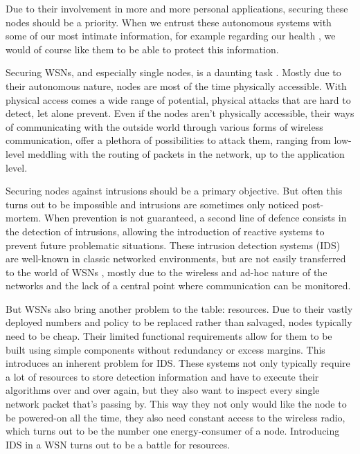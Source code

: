 \documentclass[conference]{IEEEtran}
\begin{document}
Due to their involvement in more and more personal applications, securing these
nodes should be a priority. When we entrust these autonomous systems with some
of our most intimate information, for example regarding our health
\cite{stankovic2005wireless}, we would of course like them to be able to
protect this information.

Securing WSNs, and especially single nodes, is a daunting task
\cite{perrig2004security}. Mostly due to their autonomous nature, nodes are
most of the time physically accessible. With physical access comes a wide range
of potential, physical attacks \cite{becher2006tampering} that are hard to
detect, let alone prevent. Even if the nodes aren't physically accessible,
their ways of communicating with the outside world through various forms of
wireless communication, offer a plethora of possibilities
\cite{padmavathi2009survey} to attack them, ranging from low-level meddling
with the routing of packets in the network, up to the application level.

Securing nodes against intrusions should be a primary objective. But often this
turns out to be impossible and intrusions are sometimes only noticed
post-mortem. When prevention is not guaranteed, a second line of defence
consists in the detection of intrusions, allowing the introduction of reactive
systems to prevent future problematic situations. These intrusion detection
systems (IDS) are well-known in classic networked environments, but are not
easily transferred to the world of WSNs \cite{zhang2000intrusion}
\cite{djenouri2005survey}, mostly due to the wireless and ad-hoc nature of the
networks and the lack of a central point where communication can be monitored.

But WSNs also bring another problem to the table: resources. Due to their
vastly deployed numbers and policy to be replaced rather than salvaged, nodes
typically need to be cheap. Their limited functional requirements allow for
them to be built using simple components without redundancy or excess margins.
This introduces an inherent problem for IDS. These systems not only typically
require a lot of resources to store detection information and have to execute
their algorithms over and over again, but they also want to inspect every
single network packet that's passing by. This way they not only would like the
node to be powered-on all the time, they also need constant access to the
wireless radio, which turns out to be the number one energy-consumer of a node.
Introducing IDS in a WSN turns out to be a battle for resources.
\end{document}
